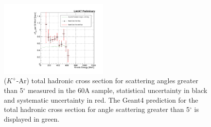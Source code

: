 \begin{figure}[htb]
\centering
\includegraphics[width=0.48\textwidth]{Chapter-7/Images/TheMoneyPlotK.pdf}
\caption{ ($K^+$-Ar) total hadronic cross section for  scattering angles greater than 5$^\circ$ measured in the 60A sample, statistical uncertainty in black and systematic uncertainty in red. The Geant4 prediction for the total hadronic cross section for angle scattering greater than 5$^\circ$ is displayed in green. } 
\label{fig:FinalXSKaon}
\end{figure}

